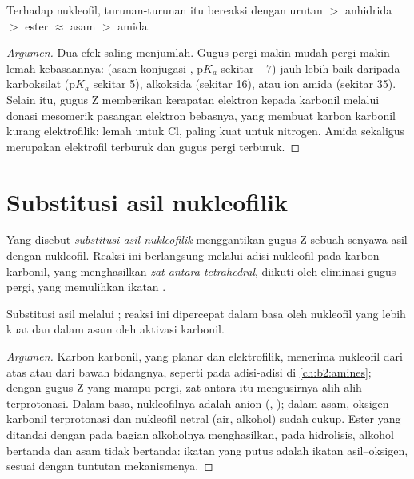 \begin{proposition}\label{prop:b2:acyl-substitution:reactivity}
Terhadap nukleofil, turunan-turunan itu bereaksi dengan urutan 
$>$ anhidrida $>$ ester $\approx$ asam $>$ amida.
\end{proposition}

\begin{proof}[Argumen]
Dua efek saling menjumlah. Gugus pergi  makin mudah pergi makin lemah
kebasaannya:  (asam konjugasi , $\mathrm pK_a$ sekitar $-7$)
jauh lebih baik daripada karboksilat ($\mathrm pK_a$ sekitar 5), alkoksida
(sekitar 16), atau ion amida (sekitar 35). Selain itu, gugus Z memberikan
kerapatan elektron kepada karbonil melalui donasi mesomerik pasangan
elektron bebasnya, yang membuat karbon karbonil kurang elektrofilik: lemah
untuk Cl, paling kuat untuk nitrogen. Amida sekaligus merupakan elektrofil
terburuk dan gugus pergi terburuk.
\end{proof}

\section{Substitusi asil nukleofilik}

\begin{definition}\label{def:b2:acyl-substitution:nas}
Yang disebut \emph{substitusi asil nukleofilik}
menggantikan gugus Z sebuah senyawa asil dengan nukleofil. Reaksi ini
berlangsung melalui adisi nukleofil pada karbon karbonil, yang menghasilkan
\emph{zat antara tetrahedral}, diikuti oleh
eliminasi gugus pergi, yang memulihkan ikatan .
\end{definition}

\begin{proposition}\label{prop:b2:acyl-substitution:addition-elimination}
Substitusi asil melalui ; reaksi ini dipercepat dalam
basa oleh nukleofil yang lebih kuat dan dalam asam oleh aktivasi karbonil.
\end{proposition}

\begin{proof}[Argumen]
Karbon karbonil, yang planar dan elektrofilik, menerima nukleofil dari atas
atau dari bawah bidangnya, seperti pada adisi-adisi di \cref{ch:b2:amines};
dengan gugus Z yang mampu pergi, zat antara itu mengusirnya alih-alih
terprotonasi. Dalam basa, nukleofilnya adalah anion (,
); dalam asam, oksigen karbonil terprotonasi dan nukleofil netral
(air, alkohol) sudah cukup. Ester yang ditandai dengan  pada
bagian alkoholnya menghasilkan, pada hidrolisis, alkohol bertanda dan asam
tidak bertanda: ikatan yang putus adalah ikatan asil--oksigen, sesuai dengan
tuntutan mekanismenya.
\end{proof}

